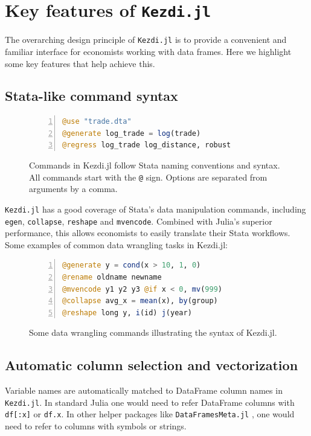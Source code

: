 \documentclass{juliacon}
\begin{document}
\section{Key features of \texttt{Kezdi.jl}}

The overarching design principle of \texttt{Kezdi.jl} is to provide a convenient and familiar interface for economists working with data frames. Here we highlight some key features that help achieve this.

\subsection{Stata-like command syntax}

\begin{figure}[h!]
\begin{lstlisting}[language = Julia, numbers=left, numberstyle=\tiny\color{gray}]
@use "trade.dta"
@generate log_trade = log(trade)
@regress log_trade log_distance, robust
\end{lstlisting}
\caption{Commands in Kezdi.jl follow Stata naming conventions and syntax. All commands start with the \texttt{@} sign. Options are separated from arguments by a comma.}
\label{fig:syntax}
\end{figure}

\texttt{Kezdi.jl} has a good coverage of Stata's data manipulation commands, including \texttt{egen}, \texttt{collapse}, \texttt{reshape} and \texttt{mvencode}. Combined with Julia's superior performance, this allows economists to easily translate their Stata workflows. Some examples of common data wrangling tasks in Kezdi.jl:

\begin{figure}[h!]
\begin{lstlisting}[language = Julia, numbers=left, numberstyle=\tiny\color{gray}]
@generate y = cond(x > 10, 1, 0)
@rename oldname newname
@mvencode y1 y2 y3 @if x < 0, mv(999)
@collapse avg_x = mean(x), by(group)
@reshape long y, i(id) j(year)
\end{lstlisting}
\caption{Some data wrangling commands illustrating the syntax of Kezdi.jl.}
\label{fig:wrangling}
\end{figure}

\subsection{Automatic column selection and vectorization}

Variable names are automatically matched to DataFrame column names in \texttt{Kezdi.jl}. In standard Julia one would need to refer DataFrame columns with \texttt{df[:x]} or \texttt{df.x}. In other helper packages like \texttt{DataFramesMeta.jl} \cite{DataFramesMeta}, one would need to refer to columns with symbols or strings.
\end{document}
